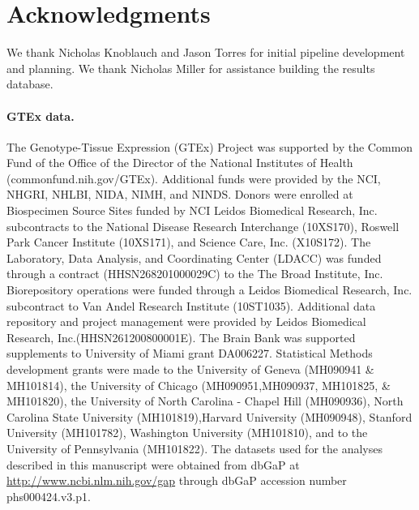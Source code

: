 \documentclass[10pt,letterpaper]{article}
\begin{document}
\section*{Acknowledgments}
We thank Nicholas Knoblauch and Jason Torres for initial pipeline
development and planning. We thank Nicholas Miller for assistance building
the results database.

%


\paragraph{GTEx data.}\label{gtex-data}

The Genotype-Tissue Expression (GTEx) Project was supported by the
Common Fund of the Office of the Director of the National Institutes of
Health (commonfund.nih.gov/GTEx). Additional funds were provided by the
NCI, NHGRI, NHLBI, NIDA, NIMH, and NINDS. Donors were enrolled at
Biospecimen Source Sites funded by NCI Leidos Biomedical Research, Inc.
subcontracts to the National Disease Research Interchange (10XS170),
Roswell Park Cancer Institute (10XS171), and Science Care, Inc.
(X10S172). The Laboratory, Data Analysis, and Coordinating Center
(LDACC) was funded through a contract (HHSN268201000029C) to the The
Broad Institute, Inc. Biorepository operations were funded through a
Leidos Biomedical Research, Inc. subcontract to Van Andel Research
Institute (10ST1035). Additional data repository and project management
were provided by Leidos Biomedical Research, Inc.(HHSN261200800001E).
The Brain Bank was supported supplements to University of Miami grant
DA006227. Statistical Methods development grants were made to the
University of Geneva (MH090941 \& MH101814), the University of Chicago
(MH090951,MH090937, MH101825, \& MH101820), the University of North
Carolina - Chapel Hill (MH090936), North Carolina State University
(MH101819),Harvard University (MH090948), Stanford University
(MH101782), Washington University (MH101810), and to the University of
Pennsylvania (MH101822). The datasets used for the analyses described in
this manuscript were obtained from dbGaP at
\url{http://www.ncbi.nlm.nih.gov/gap} through dbGaP accession number
phs000424.v3.p1.
\end{document}
